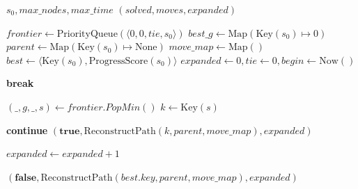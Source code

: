   \begin{algorithm}[H]
    \caption{Uniform-Cost Search (UCS) - Main Loop}
    \label{alg:ucs_main}
    \begin{algorithmic}[1]
        \Require $s_0, \textit{max\_nodes}, \textit{max\_time}$
        \Ensure $(solved, moves, \textit{expanded})$
        
            \State $\textit{frontier} \gets \text{PriorityQueue}(\langle 0, 0, \textit{tie}, s_0 \rangle)$
            \State $\textit{best\_g} \gets \text{Map}(\text{Key}(s_0) \mapsto 0)$
            \State $\textit{parent} \gets \text{Map}(\text{Key}(s_0) \mapsto \text{None})$
            \State $\textit{move\_map} \gets \text{Map}()$
            \State $\textit{best} \gets \langle \text{Key}(s_0), \text{ProgressScore}(s_0) \rangle$
            \State $\textit{expanded} \gets 0, \textit{tie} \gets 0, \textit{begin} \gets \text{Now}()$

                    \State \textbf{break}
                \EndIf
                
                \State $(\_, g, \_, s) \gets \textit{frontier.PopMin}()$
                \State $k \gets \text{Key}(s)$

                 \textbf{continue} \EndIf
                    \State \Return $(\textbf{true}, \text{ReconstructPath}(k, \textit{parent}, \textit{move\_map}), \textit{expanded})$
                \EndIf

                \State $\textit{expanded} \gets \textit{expanded} + 1$
                \State {}
                \State {}
            \EndWhile
            
            \State \Return $(\textbf{false}, \text{ReconstructPath}(\textit{best.key}, \textit{parent}, \textit{move\_map}), \textit{expanded})$
        \EndFunction
    \end{algorithmic}
\end{algorithm}

